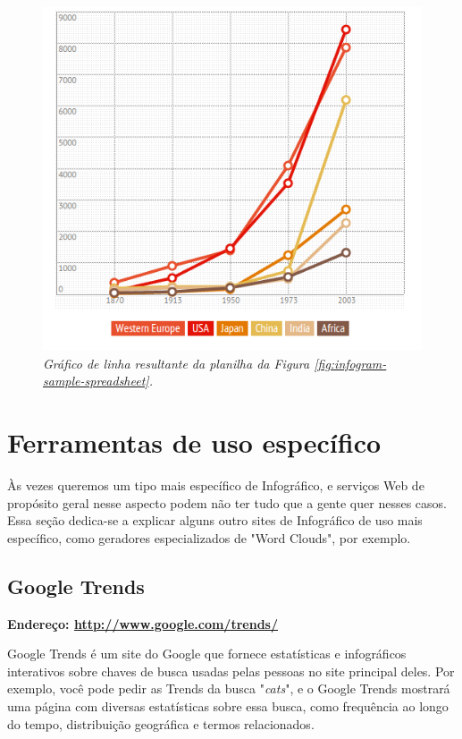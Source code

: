 \documentclass[12pt,onecolumn]{article}
\begin{document}
    \begin{figure}[ht]
      \centering
      \includegraphics[width=.9\linewidth]{infogram-sample-chart.png}
      \caption{
        \footnotesize
        \it
        Gráfico de linha resultante da planilha da Figura
        \ref{fig:infogram-sample-spreadsheet}.
      }
      \label{fig:infogram-sample-chart}
    \end{figure}

\clearpage
\section{Ferramentas de uso específico}
  Às vezes queremos um tipo mais específico de Infográfico, e serviços Web de
  propósito geral nesse aspecto podem não ter tudo que a gente quer nesses
  casos. Essa seção dedica-se a explicar alguns outro sites de Infográfico de
  uso mais específico, como geradores especializados de "Word Clouds", por
  exemplo.

  \subsection{Google Trends}
    \textbf{Endereço: \url{http://www.google.com/trends/}}
    
    Google Trends é um site do Google que fornece estatísticas e infográficos
    interativos sobre chaves de busca usadas pelas pessoas no site principal
    deles. Por exemplo, você pode pedir as Trends da busca "\textit{cats}", e o
    Google Trends mostrará uma página com diversas estatísticas sobre essa
    busca, como frequência ao longo do tempo, distribuição geográfica e termos
    relacionados.
    
\end{document}
